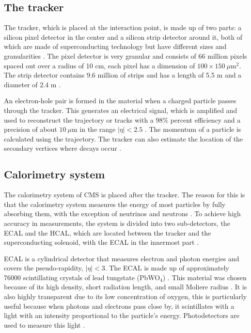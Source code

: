\subsection{The tracker}
The tracker, which is placed at the interaction point, is made up of two parts: a silicon pixel detector in the center and a silicon strip detector around it, both of which are made of superconducting technology but have different sizes and granularities \cite{sanchez2020search}. The pixel detector is very granular and consists of 66 million pixels spaced out over a radius of 10 cm, each pixel has a dimension of $100 \times 150 \ \mu \text{m}^2$. The strip detector contains 9.6 million of strips and has a length of 5.5 m and a diameter of 2.4 m \cite{fedi2016studies, danilov2020measurement}.

An electron-hole pair is formed in the material when a charged particle passes through the tracker. This generates an electrical signal, which is amplified and used to reconstruct the trajectory or tracks with a 98$\%$ percent efficiency and a precision of about $10 \ \mu$m in the range $|\eta| < 2.5$ \cite{baron2018desarrollo, di2020measurement}. The momentum of a particle is calculated using the trajectory. The tracker can also estimate the location of the secondary vertices where decays occur \cite{fedi2016studies}.
\subsection{Calorimetry system}
\label{cal_sys}
The calorimetry system of CMS is placed after the tracker. The reason for this is that the calorimetry system measures the energy of most particles by fully absorbing them, with the exception of neutrinos and neutrons \cite{bragagnolo2021measurement}. To achieve high accuracy in measurements, the system is divided into two sub-detectors, the ECAL and the HCAL, which are located between the tracker and the superconducting solenoid, with the ECAL in the innermost part \cite{presilla2021lepton}.

ECAL is a cylindrical detector that measures electron and photon energies and covers the pseudo-rapidity, $|\eta| < 3$. The ECAL is made up of approximately 76000 scintillating crystals of lead tungstate (PbWO$_4$) \cite{fedi2016studies, mejia2012medida}. This material was chosen because of its high density, short radiation length, and small Moliere radius \cite{danilov2020measurement}. It is also highly transparent due to its low concentration of oxygen, this is particularly useful because when photons and electrons pass close by, it scintillates with a light with an intensity proportional to the particle's energy. Photodetectors are used to measure this light \cite{di2020measurement, mejia2012medida}.

